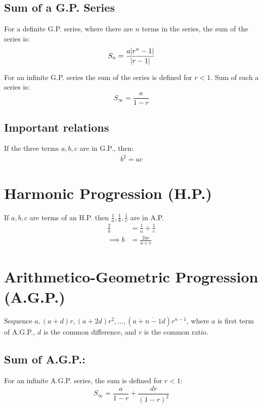 \subsection{Sum of a G.P. Series}
For a definite G.P. series, where there are $n$ terms in the series, the sum of the series is:
\begin{equation}
	S_n = \frac{a\abs{r^n-1}}{\abs{r-1}} %
\end{equation}

For an infinite G.P. series the sum of the series is defined for $r<1$. Sum of such a series is:
\begin{equation}
	S_\infty = \frac{a}{1-r}
\end{equation}

\subsection{Important relations}
If the three terms $a,b,c$ are in G.P., then:
\begin{align}
	b^2 = ac
\end{align}


\section{Harmonic Progression (H.P.)}
If $a, b, c$ are terms of an H.P. then $\frac{1}{a}, \frac{1}{b}, \frac{1}{c}$ are in A.P.
\begin{align}
	\frac{2}{b} &= \frac{1}{a} + \frac{1}{c}\\
	\implies b &= \frac{2ac}{a+c}
\end{align}


\section{Arithmetico-Geometric Progression (A.G.P.)}
Sequence $a, (a+d)r, (a+2d)r^2,\ldots, (a+\overline{n-1}d)r^{n-1}$, where $a$ is first term of A.G.P., $d$ is the common difference, and $r$ is the common ratio.

\subsection{Sum of A.G.P.:}
For an infinite A.G.P. series, the sum is defined for $r<1$:
\begin{equation}
	S_\infty = \frac{a}{1-r} + \frac{dr}{(1-r)^2}
\end{equation}


